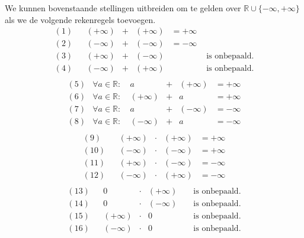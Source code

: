 \documentclass[main.tex]{subfiles}
\begin{document}
\begin{bst}
  We kunnen bovenstaande stellingen uitbreiden om te gelden over $\mathbb{R}\cup\{ -\infty,+\infty\}$ als we de volgende rekenregels toevoegen.
  \[
  \begin{array}{crccccl}
    (1) &                        & (+\infty) &+    & (+\infty) &= +\infty\\
    (2) &                        & (-\infty) &+    & (-\infty) &= -\infty\\
    (3) &                        & (+\infty) &+    & (-\infty) & & \text{ is onbepaald.} \\
    (4) &                        & (-\infty) &+    & (+\infty) & & \text{ is onbepaald.} \\
  \end{array}
  \]
  \[
  \begin{array}{crccccl}
    (5) & \forall a \in \mathbb{R}:\        & a         &+    & (+\infty) &= + \infty \\
    (6) & \forall a \in \mathbb{R}:\        & (+\infty) &+    & a         &= + \infty \\
    (7) & \forall a \in \mathbb{R}:\        & a         &+    & (-\infty) &= - \infty \\
    (8) & \forall a \in \mathbb{R}:\        & (-\infty) &+    & a         &= - \infty \\
  \end{array}
  \]
  \[
  \begin{array}{crccccl}
    (9) &                          & (+\infty) &\cdot& (+\infty) &= +\infty\\
    (10) &                          & (-\infty) &\cdot& (-\infty) &= +\infty\\
    (11) &                          & (+\infty) &\cdot& (-\infty) &= -\infty\\
    (12) &                          & (-\infty) &\cdot& (+\infty) &= -\infty\\
  \end{array}
  \]
  \[
  \begin{array}{crccccl}
    (13) &                          & 0         &\cdot& (+\infty) & & \text{ is onbepaald.} \\
    (14) &                          & 0         &\cdot& (-\infty) & & \text{ is onbepaald.} \\
    (15) &                          & (+\infty) &\cdot& 0         & & \text{ is onbepaald.} \\
    (16) &                          & (-\infty) &\cdot& 0         & & \text{ is onbepaald.} \\

\end{array}\]
\end{bst}
\end{document}
